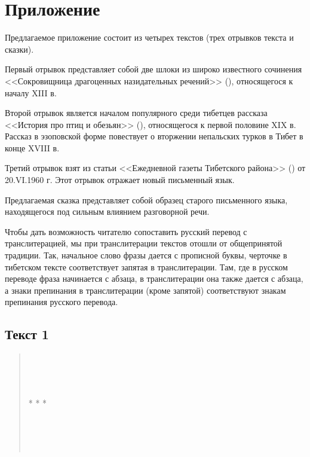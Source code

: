\chapter{Приложение}

Предлагаемое приложение состоит из четырех текстов (трех отрывков текста и сказки).

Первый отрывок представляет собой две шлоки из широко известного сочинения <<Сокровищница драгоценных назидательных речений>> (), относящегося к началу XIII в.

Второй отрывок является началом популярного среди тибетцев рассказа <<История про птиц и обезьян>> (), относящегося к первой половине XIX в. Рассказ в эзоповской форме повествует о вторжении непальских турков в Тибет в конце XVIII в.

Третий отрывок взят из статьи <<Ежедневной газеты Тибетского района>> () от 20.VI.1960 г. Этот отрывок отражает новый письменный язык.

Предлагаемая сказка представляет собой образец старого письменного языка, находящегося под сильным влиянием разговорной речи.

Чтобы дать возможность читателю сопоставить русский перевод с транслитерацией, мы при транслитерации текстов отошли от общепринятой традиции. Так, начальное слово фразы дается с прописной буквы, черточке в тибетском тексте соответствует запятая в транслитерации. Там, где в русском переводе фраза начинается с абзаца, в транслитерации она также дается с абзаца, а знаки препинания в транслитерации (кроме запятой) соответствуют знакам препинания русского перевода.
\pagebreak

\section{Текст 1}

\begin{verse}
	\\
	\\
	\\

	* * *

	\\
	\\
	\\
\end{verse}

